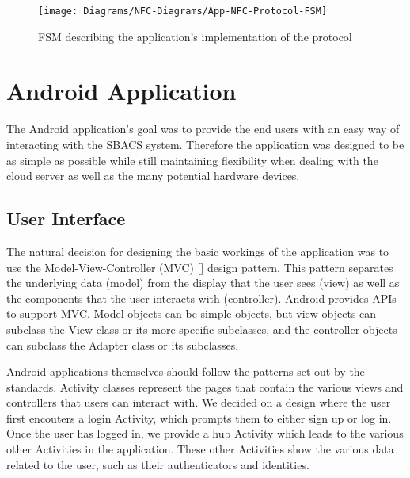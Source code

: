 \documentclass[12pt]{report}
\let\Oldsection\section
\renewcommand{\section}{\FloatBarrier\Oldsection}
\let\Oldsubsection\subsection
\renewcommand{\subsection}{\FloatBarrier\Oldsubsection}
\begin{document}
\begin{figure}
    \texttt{[image: Diagrams/NFC-Diagrams/App-NFC-Protocol-FSM]}
    \caption{FSM describing the application's implementation of the protocol}
    \label{fig:nfc-protocol-fsm-app}
\end{figure}



\section{Android Application} \label{android-application}

The Android application's goal was to provide the end users with an easy way of interacting with the SBACS system.
Therefore the application was designed to be as simple as possible while still maintaining flexibility when dealing with
the cloud server as well as the many potential hardware devices.


\subsection{User Interface} \label{user-interface}

The natural decision for designing the basic workings of the application was to use the Model-View-Controller (MVC) [] 
design pattern. This pattern separates the underlying data (model) from the display that the user sees (view) as well as
the components that the user interacts with (controller). Android provides APIs to support MVC. Model objects can be
simple objects, but view objects can subclass the View class or its more specific subclasses, and the controller
objects can subclass the Adapter class or its subclasses.

Android applications themselves should follow the patterns set out by the standards. Activity classes represent the
pages that contain the various views and controllers that users can interact with. We decided on a design where the user
first encouters a login Activity, which prompts them to either sign up or log in. Once the user has logged in, we
provide a hub Activity which leads to the various other Activities in the application. These other Activities show the
various data related to the user, such as their authenticators and identities.
\end{document}
